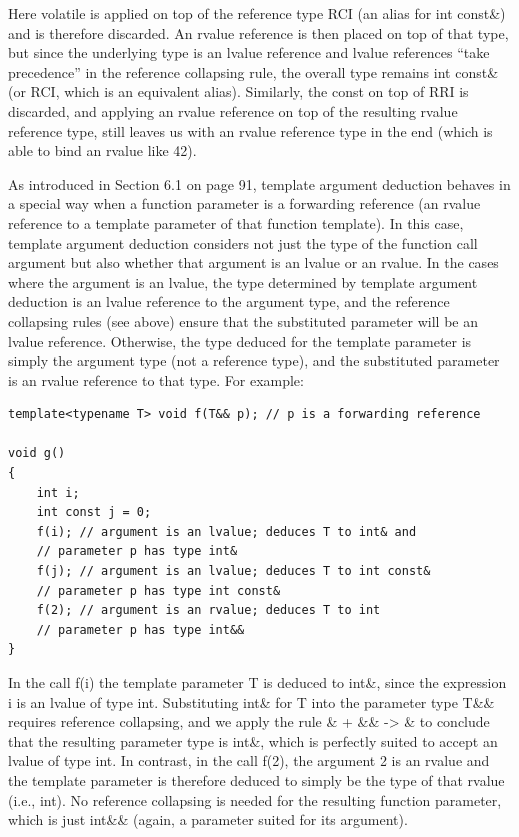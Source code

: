Here volatile is applied on top of the reference type RCI (an alias for int const\&) and is therefore discarded. An rvalue reference is then placed on top of that type, but since the underlying type is an lvalue reference and lvalue references “take precedence” in the reference collapsing rule, the overall type remains int const\& (or RCI, which is an equivalent alias). Similarly, the const on top of RRI is discarded, and applying an rvalue reference on top of the resulting rvalue reference type, still leaves us with an rvalue reference type in the end (which is able to bind an rvalue like 42).


As introduced in Section 6.1 on page 91, template argument deduction behaves in a special way when a function parameter is a forwarding reference (an rvalue reference to a template parameter of that function template). In this case, template argument deduction considers not just the type of the function call argument but also whether that argument is an lvalue or an rvalue. In the cases where the argument is an lvalue, the type determined by template argument deduction is an lvalue reference to the argument type, and the reference collapsing rules (see above) ensure that the substituted parameter will be an lvalue reference. Otherwise, the type deduced for the template parameter is simply the argument type (not a reference type), and the substituted parameter is an rvalue reference to that type. For example:

\begin{lstlisting}[style=styleCXX]
template<typename T> void f(T&& p); // p is a forwarding reference

void g()
{
	int i;
	int const j = 0;
	f(i); // argument is an lvalue; deduces T to int& and
	// parameter p has type int&
	f(j); // argument is an lvalue; deduces T to int const&
	// parameter p has type int const&
	f(2); // argument is an rvalue; deduces T to int
	// parameter p has type int&&
}
\end{lstlisting}

In the call f(i) the template parameter T is deduced to int\&, since the expression i is an lvalue of type int. Substituting int\& for T into the parameter type T\&\& requires reference collapsing, and we apply the rule \& + \&\& -> \& to conclude that the resulting parameter type is int\&, which is perfectly suited to accept an lvalue of type int. In contrast, in the call f(2), the argument 2 is an rvalue and the template parameter is therefore deduced to simply be the type of that rvalue (i.e., int). No reference collapsing is needed for the resulting function parameter, which is just int\&\& (again, a parameter suited for its argument).

